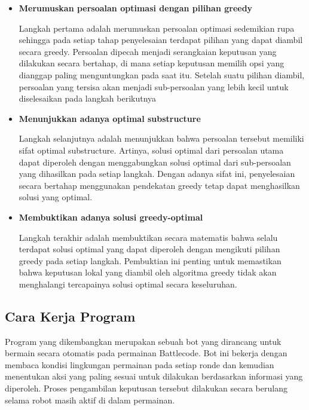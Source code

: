 \documentclass{article}
\begin{document}
\begin{itemize}

\item \textbf{Merumuskan persoalan optimasi dengan pilihan greedy}

Langkah pertama adalah merumuskan persoalan optimasi sedemikian rupa sehingga pada setiap tahap 
penyelesaian terdapat pilihan yang dapat diambil secara greedy. Persoalan dipecah menjadi serangkaian 
keputusan yang dilakukan secara bertahap, di mana setiap keputusan memilih opsi yang dianggap paling 
menguntungkan pada saat itu. Setelah suatu pilihan diambil, persoalan yang tersisa akan menjadi 
sub-persoalan yang lebih kecil untuk diselesaikan pada langkah berikutnya

\item \textbf{Menunjukkan adanya optimal substructure}

Langkah selanjutnya adalah menunjukkan bahwa persoalan tersebut memiliki sifat optimal substructure. 
Artinya, solusi optimal dari persoalan utama dapat diperoleh dengan menggabungkan solusi optimal dari 
sub-persoalan yang dihasilkan pada setiap langkah. Dengan adanya sifat ini, penyelesaian secara bertahap 
menggunakan pendekatan greedy tetap dapat menghasilkan solusi yang optimal.

\item \textbf{Membuktikan adanya solusi greedy-optimal}

Langkah terakhir adalah membuktikan secara matematis bahwa selalu terdapat solusi optimal yang dapat 
diperoleh dengan mengikuti pilihan greedy pada setiap langkah. Pembuktian ini penting untuk 
memastikan bahwa keputusan lokal yang diambil oleh algoritma greedy tidak akan menghalangi 
tercapainya solusi optimal secara keseluruhan.

\end{itemize}

\subsection{Cara Kerja Program}

Program yang dikembangkan merupakan sebuah bot yang dirancang untuk bermain secara otomatis pada 
permainan Battlecode. Bot ini bekerja dengan membaca kondisi lingkungan permainan pada setiap ronde 
dan kemudian menentukan aksi yang paling sesuai untuk dilakukan berdasarkan informasi yang 
diperoleh. Proses pengambilan keputusan tersebut dilakukan secara berulang selama robot masih aktif di 
dalam permainan.
\end{document}
